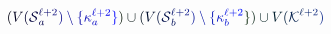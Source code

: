 \documentclass[12pt]{article}
\begin{document}
\makeatletter
\renewcommand*{\@textcolor}[3]{%
  \protect\leavevmode
  \begingroup
    \color#1{#2}#3%
  \endgroup
}
\makeatother
\begin{displaymath}
\mathcolor[RGB]{0,0,15}{(} \mathcolor[RGB]{0,0,30}{V} \mathcolor[RGB]{0,0,45}{(} \mathcal { \mathcolor[RGB]{0,0,60}{S} } _ { \mathcolor[RGB]{0,0,75}{a} } ^ { \mathcolor[RGB]{0,0,90}{\ell} \mathcolor[RGB]{0,0,105}{+} \mathcolor[RGB]{0,0,120}{2} } \mathcolor[RGB]{0,0,135}{)} \mathcolor[RGB]{0,0,150}{\setminus} \mathcolor[RGB]{0,0,165}{\{} \mathcolor[RGB]{0,0,180}{\kappa} _ { \mathcolor[RGB]{0,0,195}{a} } ^ { \mathcolor[RGB]{0,0,210}{\ell} \mathcolor[RGB]{0,0,225}{+} \mathcolor[RGB]{0,0,240}{2} } \mathcolor[RGB]{0,0,255}{\}} \mathcolor[RGB]{0,15,0}{)} \mathcolor[RGB]{0,15,15}{\cup} \mathcolor[RGB]{0,15,30}{(} \mathcolor[RGB]{0,15,45}{V} \mathcolor[RGB]{0,15,60}{(} \mathcal { \mathcolor[RGB]{0,15,75}{S} } _ { \mathcolor[RGB]{0,15,90}{b} } ^ { \mathcolor[RGB]{0,15,105}{\ell} \mathcolor[RGB]{0,15,120}{+} \mathcolor[RGB]{0,15,135}{2} } \mathcolor[RGB]{0,15,150}{)} \mathcolor[RGB]{0,15,165}{\setminus} \mathcolor[RGB]{0,15,180}{\{} \mathcolor[RGB]{0,15,195}{\kappa} _ { \mathcolor[RGB]{0,15,210}{b} } ^ { \mathcolor[RGB]{0,15,225}{\ell} \mathcolor[RGB]{0,15,240}{+} \mathcolor[RGB]{0,15,255}{2} } \mathcolor[RGB]{0,30,0}{\}} \mathcolor[RGB]{0,30,15}{)} \mathcolor[RGB]{0,30,30}{\cup} \mathcolor[RGB]{0,30,45}{V} \mathcolor[RGB]{0,30,60}{(} \mathcal { \mathcolor[RGB]{0,30,75}{K} } ^ { \mathcolor[RGB]{0,30,90}{\ell} \mathcolor[RGB]{0,30,105}{+} \mathcolor[RGB]{0,30,120}{2} } \mathcolor[RGB]{0,30,135}{)}
\end{displaymath}
\end{document}
